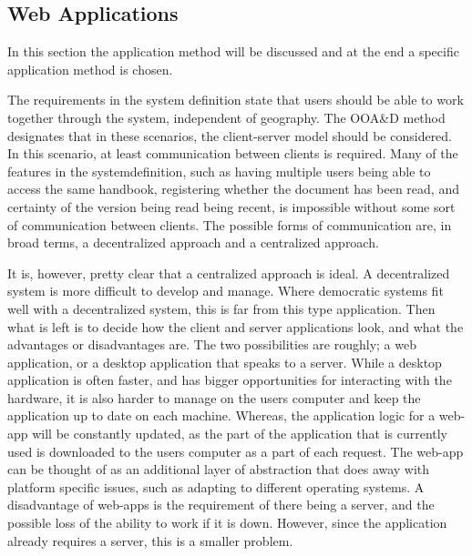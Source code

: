 \subsection{Web Applications}
In this section the application method will be discussed and at the end a specific application method is chosen.

The requirements in the system definition state that users should be able to work together through the system, independent of geography.
The OOA\&D method designates that in these scenarios, the client-server model should be considered.
In this scenario, at least communication between clients is required. 
Many of the features in the systemdefinition, such as having multiple users being able to access the same handbook, registering whether the document has been read, and certainty of the version being read being recent, is impossible without some sort of communication between clients.
The possible forms of communication are, in broad terms, a decentralized approach and a centralized approach.

It is, however, pretty clear that a centralized approach is ideal. 
A decentralized system is more difficult to develop and manage. 
Where democratic systems fit well with a decentralized system, this is far from this type application.
Then what is left is to decide how the client and server applications look, and what the advantages or disadvantages are. 
The two possibilities are roughly; a web application, or a desktop application that speaks to a server. 
While a desktop application is often faster, and has bigger opportunities for interacting with the hardware, it is also harder to manage on the users computer and keep the application up to date on each machine. 
Whereas, the application logic for a web-app will be constantly updated, as the part of the application that is currently used is downloaded to the users computer as a part of each request.
The web-app can be thought of as an additional layer of abstraction that does away with platform specific issues, such as adapting to different operating systems. 
A disadvantage of web-apps is the requirement of there being a server, and the possible loss of the ability to work if it is down. 
However, since the application already requires a server, this is a smaller problem.

